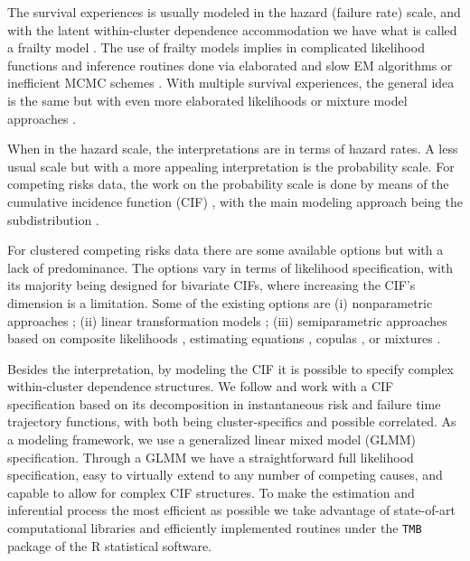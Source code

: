 \documentclass[oupdraft]{bio}
\begin{document}
The survival experiences is usually modeled in the hazard (failure rate)
scale, and with the latent within-cluster dependence accommodation we
have what is called a frailty model
\citep{frailty78,frailty79,liang95,petersen98}. The use of frailty
models implies in complicated likelihood functions and inference
routines done via elaborated and slow EM algorithms
\citep{nielsen92,klein92} or inefficient MCMC schemes
\citep{hougaard00}. With multiple survival experiences, the general idea
is the same but with even more elaborated likelihoods
\citep{prentice78,therneau00} or mixture model approaches
\citep{larson85,kuk92}.

When in the hazard scale, the interpretations are in terms of hazard
rates. A less usual scale but with a more appealing interpretation is
the probability scale. For competing risks data, the work on the
probability scale is done by means of the cumulative incidence function
(CIF) \citep{andersen12}, with the main modeling approach being the
subdistribution \citep{fine&gray}.

For clustered competing risks data there are some available options but
with a lack of predominance. The options vary in terms of likelihood
specification, with its majority being designed for bivariate CIFs,
where increasing the CIF's dimension is a limitation. Some of the
existing options are (i) nonparametric approaches
\citep{cheng07,cheng09}; (ii) linear transformation models
\citep{fine99,gerds12}; (iii) semiparametric approaches based on
composite likelihoods \citep{shih,SCHEIKE}, estimating equations
\citep{crossoddsratioSCHEIKE,cheng&fine}, copulas
\citep{semiparametricSCHEIKE}, or mixtures \citep{naskar05,shi13}.

Besides the interpretation, by modeling the CIF it is possible to
specify complex within-cluster dependence structures. We follow
\cite{SCHEIKE} and work with a CIF specification based on its
decomposition in instantaneous risk and failure time trajectory
functions, with both being cluster-specifics and possible correlated. As
a modeling framework, we use a generalized linear mixed model (GLMM)
specification. Through a GLMM we have a straightforward full likelihood
specification, easy to virtually extend to any number of competing
causes, and capable to allow for complex CIF structures. To make the
estimation and inferential process the most efficient as possible we
take advantage of state-of-art computational libraries and efficiently
implemented routines under the \texttt{TMB} \citep{TMB} package of the R
\citep{R21} statistical software.
\end{document}
